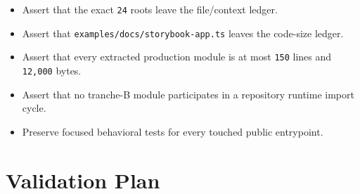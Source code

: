\begin{itemize}
\tightlist
\item
  Assert that the exact \texttt{2\allowbreak{}4} roots leave the file/context ledger.
\item
  Assert that \texttt{e\allowbreak{}x\allowbreak{}a\allowbreak{}m\allowbreak{}p\allowbreak{}l\allowbreak{}e\allowbreak{}s\allowbreak{}/\allowbreak{}d\allowbreak{}o\allowbreak{}c\allowbreak{}s\allowbreak{}/\allowbreak{}s\allowbreak{}t\allowbreak{}o\allowbreak{}r\allowbreak{}y\allowbreak{}b\allowbreak{}o\allowbreak{}o\allowbreak{}k\allowbreak{}-\allowbreak{}a\allowbreak{}p\allowbreak{}p\allowbreak{}.\allowbreak{}t\allowbreak{}s} leaves the code-size ledger.
\item
  Assert that every extracted production module is at most \texttt{1\allowbreak{}5\allowbreak{}0} lines and \texttt{1\allowbreak{}2\allowbreak{},\allowbreak{}0\allowbreak{}0\allowbreak{}0} bytes.
\item
  Assert that no tranche-B module participates in a repository runtime import cycle.
\item
  Preserve focused behavioral tests for every touched public entrypoint.
\end{itemize}

\section{Validation Plan}\label{record-246-validation-plan}

